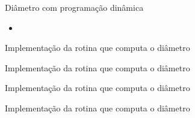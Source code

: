 \begin{frame}[fragile]{Diâmetro com programação dinâmica}

    \begin{itemize}
        \item
    \end{itemize}

\end{frame}

\begin{frame}[fragile]{Implementação da rotina que computa o diâmetro}
\end{frame}

\begin{frame}[fragile]{Implementação da rotina que computa o diâmetro}
\end{frame}

\begin{frame}[fragile]{Implementação da rotina que computa o diâmetro}
\end{frame}

\begin{frame}[fragile]{Implementação da rotina que computa o diâmetro}
\end{frame}

